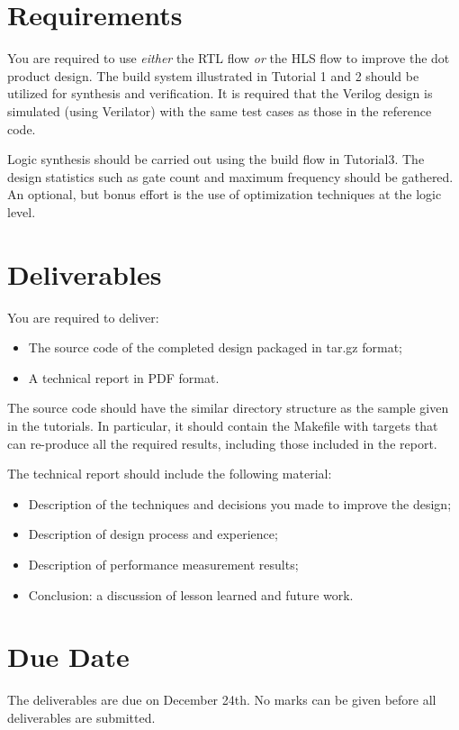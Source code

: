 \documentclass[12pt]{article}
\begin{document}
\section{Requirements}

You are required to use {\em either} the RTL flow {\em or} the HLS
flow to improve the dot product design.  The build system illustrated
in Tutorial 1 and 2 should be utilized for synthesis and
verification. It is required that the Verilog design is simulated
(using Verilator) with the same test cases as those in the reference
code.

Logic synthesis should be carried out using the build flow in
Tutorial3. The design statistics such as gate count and maximum
frequency should be gathered. An optional, but bonus effort is the use
of optimization techniques at the logic level.

\section{Deliverables}

You are required to deliver:

\begin{itemize}
  \item The source code of the completed design packaged in tar.gz format;
  \item A technical report in PDF format. 
\end{itemize}

The source code should have the similar directory structure as the
sample given in the tutorials. In particular, it should contain the
Makefile with targets that can re-produce all the required results,
including those included in the report.

The technical report should include the following material:

\begin{itemize}
  \item Description of the techniques and decisions you made to improve the design;
   \item Description of design process and experience;
  \item Description of performance measurement results;
  \item Conclusion: a discussion of lesson learned and
        future work.
\end{itemize}

\section{Due Date}

The deliverables are due on December 24th. No marks can be given
before all deliverables are submitted.
\end{document}
